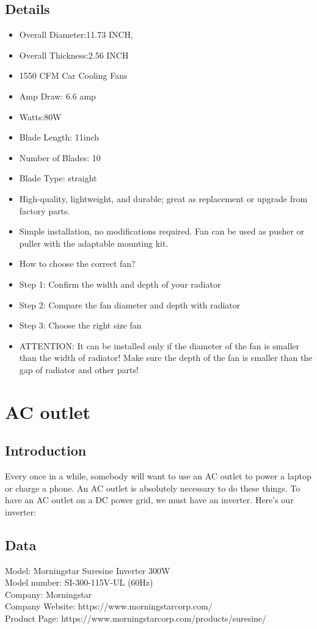 \subsection{Details}
\begin{itemize}
	\item Overall Diameter:11.73 INCH, 
	\item Overall Thickness:2.56 INCH 
	\item 1550 CFM Car Cooling Fans
	\item Amp Draw: 6.6 amp 
	\item Watts:80W
	\item Blade Length: 11inch
	\item Number of Blades: 10
	\item Blade Type: straight
	\item High-quality, lightweight, and durable; great as replacement or upgrade from factory parts.
	\item Simple installation, no modifications required. Fan can be used as pusher or puller with the adaptable mounting kit.
	\item How to choose the correct fan?
	\item Step 1: Confirm the width and depth of your radiator
	\item Step 2: Compare the fan diameter and depth with radiator 
	\item Step 3: Choose the right size fan 
	\item ATTENTION: It can be installed only if the diameter of the fan is smaller than the width of radiator! Make sure the depth of the fan is smaller than the gap of radiator and other parts! 
\end{itemize}

\section{AC outlet}

\subsection{Introduction}

Every once in a while, somebody will want to use an AC outlet to power a laptop or charge a phone. An AC outlet is absolutely necessary to do these things. To have an AC outlet on a DC power grid, we must have an inverter. Here’s our inverter:

\subsection{Data}
Model: Morningstar Suresine Inverter 300W \\
Model number: SI-300-115V-UL (60Hz) \\
Company: Morningstar \\
Company Website: https://www.morningstarcorp.com/ \\
Product Page: https://www.morningstarcorp.com/products/suresine/ \\


